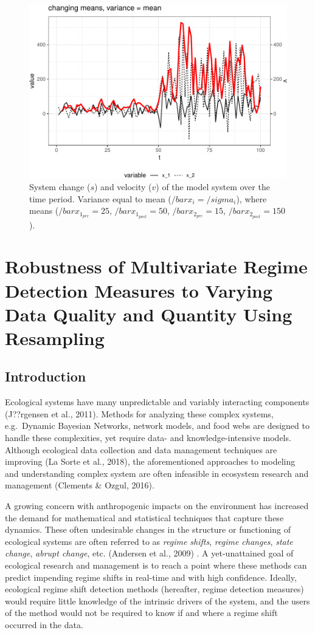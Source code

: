 \documentclass[12pt,twoside,openany]{reedthesis}
\begin{document}
\begin{figure}
\includegraphics[width=0.85\linewidth]{_myDissertation_files/figure-latex/velocSysEx4-1} \caption{System change ($s$) and velocity ($v$) of the model system over the time period. Variance equal to mean ($/bar{x_i}=/sigma_i$), where means ($/bar{x}_{1_{pre}}=25$, $/bar{x}_{1_{post}}=50$, $/bar{x}_{2_{pre}}=15$, $/bar{x}_{2_{post}}=150$).}\label{fig:velocSysEx4}
\end{figure}
\hypertarget{resampling}{%
\chapter{Robustness of Multivariate Regime Detection Measures to Varying Data Quality and Quantity Using Resampling}\label{resampling}}

\hypertarget{introduction-4}{%
\section{Introduction}\label{introduction-4}}

Ecological systems have many unpredictable and variably interacting components (J??rgensen et al., 2011). Methods for analyzing these complex systems, e.g.~Dynamic Bayesian Networks, network models, and food webs are designed to handle these complexities, yet require data- and knowledge-intensive models. Although ecological data collection and data management techniques are improving (La Sorte et al., 2018), the aforementioned approaches to modeling and understanding complex system are often infeasible in ecosystem research and management (Clements \& Ozgul, 2016).

A growing concern with anthropogenic impacts on the environment has increased the demand for mathematical and statistical techniques that capture these dynamics. These often undesirable changes in the structure or functioning of ecological systems are often referred to as \emph{regime shifts}, \emph{regime changes}, \emph{state change}, \emph{abrupt change}, etc. (Andersen et al., 2009) . A yet-unattained goal of ecological research and management is to reach a point where these methods can predict impending regime shifts in real-time and with high confidence. Ideally, ecological regime shift detection methods (hereafter, regime detection measures) would require little knowledge of the intrinsic drivers of the system, and the users of the method would not be required to know if and where a regime shift occurred in the data.
\end{document}
